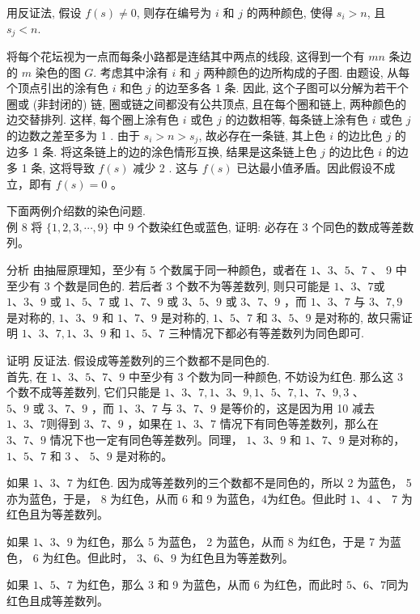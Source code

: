 \documentclass[10pt]{article}
\begin{document}
用反证法, 假设 $f(s) \neq 0$, 则存在编号为 $i$ 和 $j$ 的两种颜色, 使得 $s_{i}>n$, 且 $s_{j}<n$.

将每个花坛视为一点而每条小路都是连结其中两点的线段, 这得到一个有 $m n$ 条边的 $m$ 染色的图 $G$. 考虑其中涂有 $i$ 和 $j$ 两种颜色的边所构成的子图. 由题设, 从每个顶点引出的涂有色 $i$ 和色 $j$ 的边至多各 1 条. 因此, 这个子图可以分解为若干个圈或 (非封闭的) 链, 圈或链之间都没有公共顶点, 且在每个圈和链上, 两种颜色的边交替排列. 这样, 每个圈上涂有色 $i$ 或色 $j$ 的边数相等, 每条链上涂有色 $i$ 或色 $j$ 的边数之差至多为 1 . 由于 $s_{i}>n>s_{j}$, 故必存在一条链, 其上色 $i$ 的边比色 $j$ 的边多 1 条. 将这条链上的边的涂色情形互换, 结果是这条链上色 $j$ 的边比色 $i$ 的边多 1 条, 这将导致 $f(s)$ 减少 2 . 这与 $f(s)$ 已达最小值矛盾。因此假设不成立，即有 $f(s)=0$ 。

下面两例介绍数的染色问题.\\
例 8 将 $\{1,2,3, \cdots, 9\}$ 中 9 个数染红色或蓝色, 证明: 必存在 3 个同色的数成等差数列。

分析 由抽屉原理知，至少有 5 个数属于同一种颜色，或者在 $1 、 3 、 5 、 7$ 、 9 中至少有 3 个数是同色的. 若后者 3 个数不为等差数列, 则只可能是 $1 、 3 、 7$或 $1 、 3 、 9$ 或 $1 、 5 、 7$ 或 $1 、 7 、 9$ 或 $3 、 5 、 9$ 或 $3 、 7 、 9$ ，而 $1 、 3 、 7$ 与 $3 、 7,9$ 是对称的, $1 、 3 、 9$ 和 $1 、 7 、 9$ 是对称的, $1 、 5 、 7$ 和 $3 、 5 、 9$ 是对称的, 故只需证明 $1 、 3 、 7,1 、 3 、 9$ 和 $1 、 5 、 7$ 三种情况下都必有等差数列为同色即可.

证明 反证法. 假设成等差数列的三个数都不是同色的.\\
首先, 在 $1 、 3 、 5 、 7 、 9$ 中至少有 3 个数为同一种颜色, 不妨设为红色. 那么这 3 个数不成等差数列, 它们只能是 $1 、 3 、 7,1 、 3 、 9,1 、 5 、 7,1 、 7 、 9,3$ 、\\
$5 、 9$ 或 $3 、 7 、 9$ ，而 $1 、 3 、 7$ 与 $3 、 7 、 9$ 是等价的，这是因为用 10 减去 $1 、 3 、 7$则得到 $3 、 7 、 9$ ，如果在 $1 、 3 、 7$ 情况下有同色等差数列，那么在 $3 、 7 、 9$ 情况下也一定有同色等差数列。同理， $1 、 3 、 9$ 和 $1 、 7 、 9$ 是对称的， $1 、 5 、 7$ 和 3 、 $5 、 9$ 是对称的。

如果 $1 、 3 、 7$ 为红色. 因为成等差数列的三个数都不是同色的，所以 2 为蓝色， 5 亦为蓝色，于是， 8 为红色，从而 6 和 9 为蓝色，4为红色。但此时 $1 、 4$ 、 7 为红色且为等差数列。

如果 $1 、 3 、 9$ 为红色，那么 5 为蓝色， 2 为蓝色，从而 8 为红色，于是 7 为蓝色， 6 为红色。但此时， $3 、 6 、 9$ 为红色且为等差数列。

如果 $1 、 5 、 7$ 为红色，那么 3 和 9 为蓝色，从而 6 为红色，而此时 $5 、 6 、 7$同为红色且成等差数列。
\end{document}
